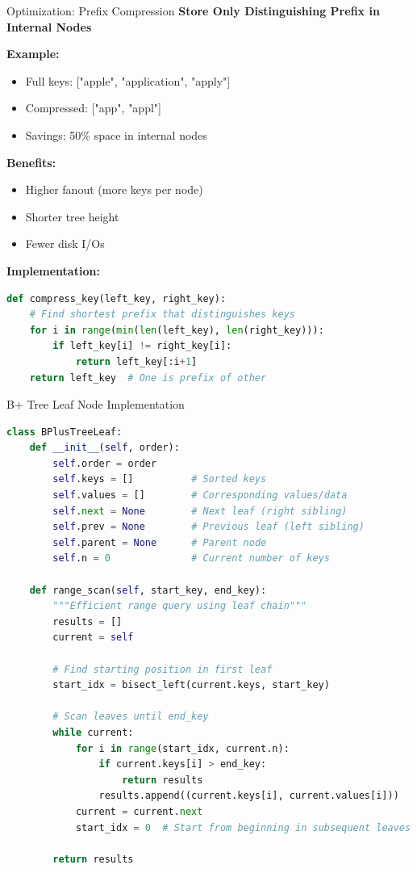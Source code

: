 \documentclass[aspectratio=169]{beamer}
\begin{document}
\begin{frame}[fragile]{Optimization: Prefix Compression}
  \textbf{Store Only Distinguishing Prefix in Internal Nodes}

  \vspace{0.3cm}
  \textbf{Example:}
  \begin{itemize}
    \item Full keys: ["apple", "application", "apply"]
    \item Compressed: ["app", "appl"]
    \item Savings: 50\% space in internal nodes
  \end{itemize}

  \vspace{0.3cm}
  \textbf{Benefits:}
  \begin{itemize}
    \item Higher fanout (more keys per node)
    \item Shorter tree height
    \item Fewer disk I/Os
  \end{itemize}

  \vspace{0.3cm}
  \textbf{Implementation:}
\begin{lstlisting}[language=Python, basicstyle=\ttfamily\tiny]
def compress_key(left_key, right_key):
    # Find shortest prefix that distinguishes keys
    for i in range(min(len(left_key), len(right_key))):
        if left_key[i] != right_key[i]:
            return left_key[:i+1]
    return left_key  # One is prefix of other
\end{lstlisting}
\end{frame}

\begin{frame}[fragile]{B+ Tree Leaf Node Implementation}
\begin{lstlisting}[language=Python, basicstyle=\ttfamily\tiny]
class BPlusTreeLeaf:
    def __init__(self, order):
        self.order = order
        self.keys = []          # Sorted keys
        self.values = []        # Corresponding values/data
        self.next = None        # Next leaf (right sibling)
        self.prev = None        # Previous leaf (left sibling)
        self.parent = None      # Parent node
        self.n = 0              # Current number of keys

    def range_scan(self, start_key, end_key):
        """Efficient range query using leaf chain"""
        results = []
        current = self

        # Find starting position in first leaf
        start_idx = bisect_left(current.keys, start_key)

        # Scan leaves until end_key
        while current:
            for i in range(start_idx, current.n):
                if current.keys[i] > end_key:
                    return results
                results.append((current.keys[i], current.values[i]))
            current = current.next
            start_idx = 0  # Start from beginning in subsequent leaves

        return results
\end{lstlisting}
\end{frame}
\end{document}
